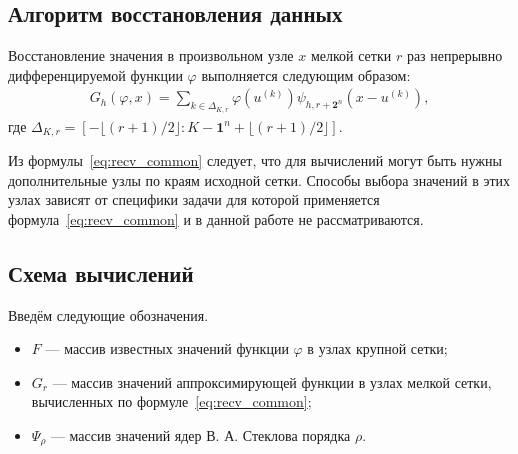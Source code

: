 
\label{sec:func_recv}

\subsection*{Алгоритм восстановления данных}

Восстановление значения в произвольном  узле $x$    мелкой сетки %
$r$ раз непрерывно дифференцируемой функции $\varphi$
выполняется следующим образом: 
\begin{gather}
  \label{eq:recv_common}
  G_h(\varphi, x) = \sum_{k\in  \Delta_{K,r}}
   \varphi(u^{(k)})
   \psi_{h, r+\mathbf{2}^n}(x-u^{(k)}),%
 \end{gather}
 где $ \Delta_{K,r}=\left[-\lfloor{(r+1)/2}\rfloor:
   K-\mathbf{1}^n+\lfloor{(r+1)/2}\rfloor\right]$.  %


Из формулы~\eqref{eq:recv_common} следует, что для вычислений
могут быть нужны дополнительные
узлы по краям исходной сетки.
Способы выбора значений в этих узлах зависят
от специфики задачи для которой применяется формула~\eqref{eq:recv_common}  
и в данной работе не рассматриваются.


\subsection*{Схема вычислений}


Введём  следующие обозначения.
\begin{itemize}

\item
  $F$  --- массив  известных значений функции $\varphi$
  в узлах крупной сетки;

\item
  $G_r$ --- массив
  значений аппроксимирующей функции в узлах мелкой сетки,
  вычисленных по формуле~\eqref{eq:recv_common};

\item
  $\Psi_{\rho}$ --- массив  значений ядер В. А. Стеклова порядка $\rho$.

\end{itemize}


